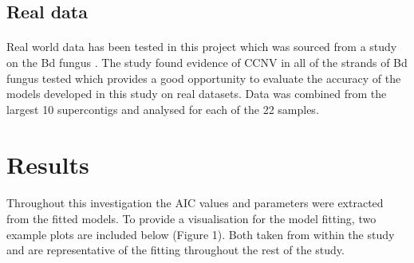 \documentclass[11pt]{article}
\begin{document}
\subsection{Real data}
\paragraph{}Real world data has been tested in this project which was sourced from a study on the Bd fungus \autocite{Farrer2013}. The study found evidence of CCNV in all of the strands of Bd fungus tested which provides a good opportunity to evaluate the accuracy of the models developed in this study on real datasets. Data was combined from the largest 10 supercontigs and analysed for each of the 22 samples.  
\section{Results}
\paragraph{}Throughout this investigation the AIC values and parameters were extracted from the fitted models. To provide a visualisation for the model fitting, two example plots are included below (Figure 1). Both taken from within the study and are representative of the fitting throughout the rest of the study.
\end{document}
